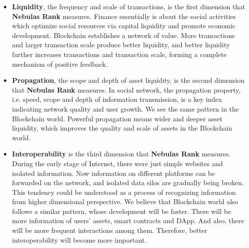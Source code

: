 \begin{itemize}
	\item \textbf{Liquidity}, the frequency and scale of transactions, is the first dimension that \textbf{Nebulas Rank} measures. Finance essentially is about the social activities which optimize social resources via capital liquidity and promote economic development. Blockchain establishes a network of value. More transactions and larger transaction scale produce better liquidity, and better liquidity further increases transactions and transaction scale, forming a complete mechanism of positive feedback.
	\item \textbf{Propagation}, the scope and depth of asset liquidity, is the second dimension that \textbf{Nebulas Rank} measures. In social network, the propagation property, i.e. speed, scope and depth of information transmission, is a key index indicating network quality and user growth. We see the same pattern in the Blockchain world. Powerful propagation means wider and deeper asset liquidity, which improves the quality and scale of assets in the Blockchain world.
	\item \textbf{Interoperability} is the third dimension that \textbf{Nebulas Rank} measures. During the early stage of Internet, there were just simple websites and isolated information. Now information on different platforms can be forwarded on the network, and isolated data silos are gradually being broken. This tendency could be understood as a process of recognizing information from higher dimensional perspective. We believe that Blockchain world also follows a similar pattern, whose development will be faster. There will be more information of users' assets, smart contracts and DApp. And also, there will be more frequent interactions among them. Therefore, better interoperability will become more important.
\end{itemize}

